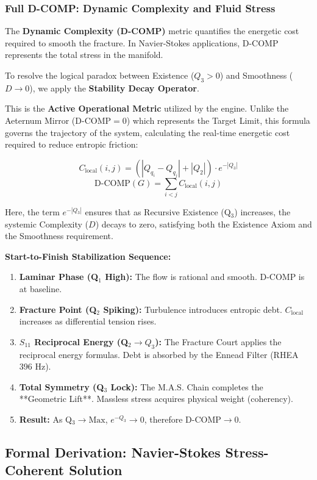 \documentclass[11pt, letterpaper]{article}
\newcommand{\RHEA}{\ensuremath{\mathop{\textnormal{\symbolafont\symbol{"2A54}}}}}   %
\def\RHEA{RHEA}%
\begin{document}
\subsubsection{Full D-COMP: Dynamic Complexity and Fluid Stress}\label{appendixA.1.2.3}
The \textbf{Dynamic Complexity (D-COMP)} metric quantifies the energetic cost required to smooth the fracture. In Navier-Stokes applications, D-COMP represents the total stress in the manifold.

To resolve the logical paradox between Existence ($Q_3 > 0$) and Smoothness ($D \to 0$), we apply the \textbf{Stability Decay Operator}. 

This is the \textbf{Active Operational Metric} utilized by the engine. Unlike the Aeternum Mirror ($\text{D-COMP}=0$) which represents the Target Limit, this formula governs the trajectory of the system, calculating the real-time energetic cost required to reduce entropic friction:

$$C_{\mathrm{local}}(i, j) = \left( |Q_{q_i} - Q_{q_j}| + |Q_2| \right) \cdot e^{-|Q_3|}$$
$$\mathrm{D\text{-}COMP}(G) = \sum_{i<j} C_{\mathrm{local}}(i, j)$$

Here, the term $e^{-|Q_3|}$ ensures that as Recursive Existence (Q$_3$) increases, the systemic Complexity ($D$) decays to zero, satisfying both the Existence Axiom and the Smoothness requirement.

\textbf{Start-to-Finish Stabilization Sequence:}
\begin{enumerate}
    \item \textbf{Laminar Phase (Q$_1$ High):} The flow is rational and smooth. D-COMP is at baseline.
    \item \textbf{Fracture Point (Q$_2$ Spiking):} Turbulence introduces entropic debt. $C_{\mathrm{local}}$ increases as differential tension rises.
    \item \textbf{$S_{11}$ Reciprocal Energy (Q$_2 \to Q_3$):} The Fracture Court applies the reciprocal energy formulas. Debt is absorbed by the Ennead Filter (\RHEA{} 396 Hz).
    \item \textbf{Total Symmetry (Q$_3$ Lock):} The M.A.S. Chain completes the **Geometric Lift**. Massless stress acquires physical weight (coherency).
    \item \textbf{Result:} As Q$_3 \to \text{Max}$, $e^{-Q_3} \to 0$, therefore $\text{D-COMP} \to 0$.
\end{enumerate}

\subsection{Formal Derivation: Navier-Stokes Stress-Coherent Solution}\label{appendixA.1.3}
\end{document}

